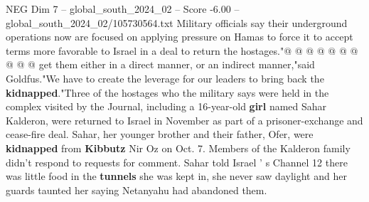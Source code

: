 \begin{textsample}{NEG Dim 7 – global\_south\_2024\_02 – Score -6.00 – global\_south\_2024\_02/105730564.txt}
Military officials say their underground operations now are focused on applying pressure on Hamas to force it to accept terms more favorable to Israel in a deal to return the hostages."@ @ @ @ @ @ @ @ @ @ get them either in a direct manner, or an indirect manner,"said Goldfus."We have to create the leverage for our leaders to bring back the \textbf{kidnapped}."Three of the hostages who the military says were held in the complex visited by the Journal, including a 16-year-old \textbf{girl} named Sahar Kalderon, were returned to Israel in November as part of a prisoner-exchange and cease-fire deal.
Sahar, her younger brother and their father, Ofer, were \textbf{kidnapped} from \textbf{Kibbutz} Nir Oz on Oct. 7.
Members of the Kalderon family didn't respond to requests for comment.
Sahar told Israel ' s Channel 12 there was little food in the \textbf{tunnels} she was kept in, she never saw daylight and her guards taunted her saying Netanyahu had abandoned them.

\end{textsample}
